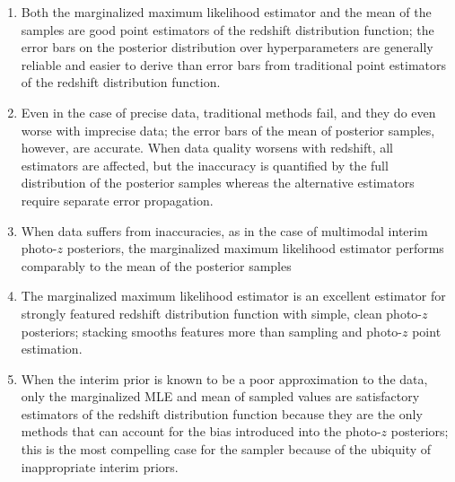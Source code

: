 \begin{enumerate}
	\item Both the marginalized maximum likelihood estimator and the mean of the samples are good point estimators of the redshift distribution function; the error bars on the posterior distribution over hyperparameters are generally reliable and easier to derive than error bars from traditional point estimators of the redshift distribution function.
	\item Even in the case of precise data, traditional methods fail, and they do even worse with imprecise data; the error bars of the mean of posterior samples, however, are accurate.  When data quality worsens with redshift, all estimators are affected, but the inaccuracy is quantified by the full distribution of the posterior samples whereas the alternative estimators require separate error propagation.  
	\item When data suffers from inaccuracies, as in the case of multimodal interim photo-$z$ posteriors, the marginalized maximum likelihood estimator performs comparably to the mean of the posterior samples
	\item The marginalized maximum likelihood estimator is an excellent estimator for strongly featured redshift distribution function with simple, clean photo-$z$ posteriors; stacking smooths features more than sampling and photo-$z$ point estimation.
	\item When the interim prior is known to be a poor approximation to the data, only the marginalized MLE and mean of sampled values are satisfactory estimators of the redshift distribution function because they are the only methods that can account for the bias introduced into the photo-$z$ posteriors; this is the most compelling case for the sampler because of the ubiquity of inappropriate interim priors.
\end{enumerate}

